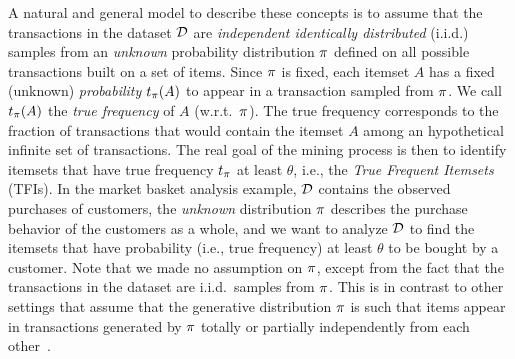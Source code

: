 A natural and general model to describe these concepts is to assume that the
transactions in the dataset ${\cal D}$ are \emph{independent identically distributed}
(i.i.d.) samples from an \emph{unknown} probability distribution $\pi$ defined
on all possible transactions built on a set of items. Since $\pi$ is fixed,
each itemset $A$ has a fixed (unknown) \emph{probability} $t_\pi(A)$ to appear
in a transaction sampled from $\pi$. We call $t_\pi(A)$ the \emph{true
frequency} of $A$ (w.r.t.~$\pi$). The true frequency corresponds to the
fraction of transactions that would contain the itemset $A$ among an
hypothetical infinite set of transactions. The real goal of the mining process
is then to identify itemsets that have true frequency $t_\pi$ at least
$\theta$, i.e., the \emph{True Frequent Itemsets} (TFIs). In the market basket
analysis example, ${\cal D}$ contains the observed purchases of customers, the
\emph{unknown} distribution $\pi$ describes the purchase behavior of the
customers as a whole, and we want to analyze ${\cal D}$ to find the itemsets that
have probability (i.e., true frequency) at least $\theta$ to be bought by a
customer. Note that we made no assumption on $\pi$, except from the fact that
the transactions in the dataset are i.i.d.~samples from $\pi$. This is in
contrast to other settings that assume that the generative distribution $\pi$
is such that items appear in transactions generated by $\pi$ totally or
partially independently from each
other~\citep{SilversteinBM98,MegiddoS98,DuMouchelP01,GionisMMT07,Hamalainen10,KirschMAPUV12}.

